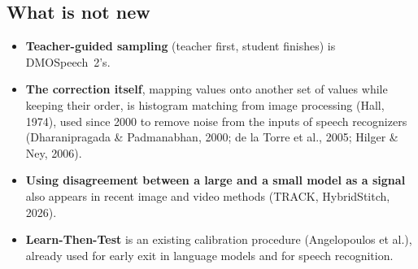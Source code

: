 \documentclass[11pt,a4paper]{article}
\newcommand{\st}[1]{\textbf{#1}}
\begin{document}
\subsection*{What is not new}
\begin{itemize}
\item \st{Teacher-guided sampling} (teacher first, student finishes) is DMOSpeech~2's.
\item \st{The correction itself}, mapping values onto another set of values while keeping their order, is histogram matching from image processing (Hall, 1974), used since 2000 to remove noise from the inputs of speech recognizers (Dharanipragada \& Padmanabhan, 2000; de la Torre et al., 2005; Hilger \& Ney, 2006).
\item \st{Using disagreement between a large and a small model as a signal} also appears in recent image and video methods (TRACK, HybridStitch, 2026).
\item \st{Learn-Then-Test} is an existing calibration procedure (Angelopoulos et al.), already used for early exit in language models and for speech recognition.
\end{itemize}
\end{document}
